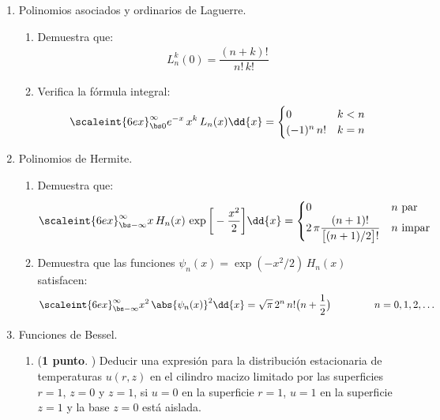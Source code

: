 \begin{enumerate}
\item Polinomios asociados y ordinarios de Laguerre.
\begin{enumerate}
\item Demuestra que:
\begin{align*}
L_{n}^{k} (0) = \dfrac{(n + k)!}{n! \, k!}
\end{align*}
\item Verifica la fórmula integral:
\begin{align*}
\scaleint{6ex}_{\bs 0}^{\infty} e^{-x} \, x^{k} \, L_{n} (x) \dd{x} = \begin{cases}
0 & k < n \\
(-1)^{n} \, n! & k = n
\end{cases}
\end{align*}
\end{enumerate}
\item Polinomios de Hermite.
\begin{enumerate}
\item Demuestra que:
\begin{align*}
\scaleint{6ex}_{\bs - \infty}^{\infty} x \, H_{n}(x) \, \exp \bigg[ - \dfrac{x^{2}}{2} \bigg] \dd{x} = \begin{cases}
0 & n \mbox{ par} \\
2 \, \pi \dfrac{(n + 1)!}{\big[ (n + 1)/2 \big]!} & n \mbox{ impar}
\end{cases}
\end{align*}
\item Demuestra que las funciones $\psi_{n} (x) = \exp(-x^{2}/2) \, H_{n} (x)$ satisfacen:
\begin{align*}
\scaleint{6ex}_{\bs -\infty}^{\infty} x^{2} \, \abs{\psi_{n} (x)}^{2} \dd{x} = \sqrt{\pi} \, 2^{n} \, n! \big( n + \dfrac{1}{2} \big) \hspace{1.5cm} n = 0, 1, 2, \ldots
\end{align*}
\end{enumerate}
\item Funciones de Bessel.
\begin{enumerate}
\item (\textbf{1 punto}. ) Deducir una expresión para la distribución estacionaria de temperaturas $u(r, z)$ en el cilindro macizo limitado por las superficies $r = 1$, $z = 0$ y $z = 1$, si $u = 0$ en la superficie $r= 1$, $u = 1$ en la superficie $z = 1$ y la base $z = 0$ está aislada.

\end{enumerate}
\end{enumerate}
